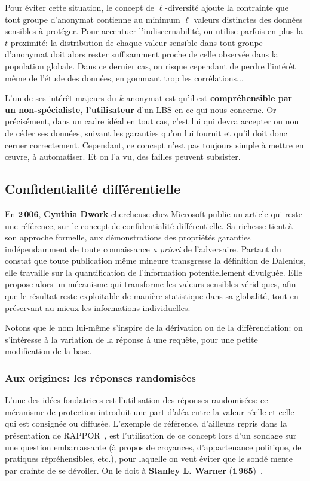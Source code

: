 \documentclass[a4paper,11pt]{article} %
\begin{document}
Pour éviter cette situation, le concept de $\ell$-diversité ajoute la contrainte que tout groupe d'anonymat contienne au minimum $\ell$ valeurs distinctes des données sensibles à protéger. 
Pour accentuer l'indiscernabilité, on utilise parfois en plus la $t$-proximité: la distribution de chaque valeur sensible dans tout groupe d'anonymat doit alors rester suffisamment proche de celle observée dans la population globale. Dans ce dernier cas, on risque cependant de perdre l'intérêt même de l'étude des données, en gommant trop les corrélations...

L'un de ses intérêt majeurs du $k$-anonymat est qu'il est \textbf{compréhensible par un non-spécialiste, l'utilisateur} d'un LBS en ce qui nous concerne.
Or précisément, dans un cadre idéal en tout cas, c'est lui qui devra accepter ou non de céder ses données, suivant les garanties qu'on lui fournit et qu'il doit donc cerner correctement.
Cependant, ce concept n'est pas toujours simple à mettre en œuvre, à automatiser. Et on l'a vu, des failles peuvent subsister. 
%
\subsection{Confidentialité différentielle}
%
En $\mathbf{2\,006}$, \textbf{Cynthia Dwork} chercheuse chez Microsoft publie un article qui reste une référence, sur le concept de confidentialité différentielle. 
Sa richesse tient à son approche formelle, aux démonstrations des propriétés garanties indépendamment de toute connaissance \textit{a priori} de l'adversaire.
Partant du constat que toute publication même mineure transgresse la définition de Dalenius, elle travaille sur la quantification de l'information potentiellement divulguée.
Elle propose alors un mécanisme qui transforme les valeurs sensibles véridiques, afin que le résultat reste exploitable de manière statistique dans sa globalité, tout en préservant au mieux les informations individuelles.

Notons que le nom lui-même s'inspire de la dérivation ou de la différenciation: on s'intéresse à la variation de la réponse à une requête, pour une petite modification de la base.

\subsubsection{Aux origines: les réponses \og randomisées\fg{}}
L'une des idées fondatrices est l'utilisation des réponses randomisées: ce mécanisme de protection introduit une part d'aléa entre la valeur réelle et celle qui est consignée ou diffusée.
L'exemple de référence, d'ailleurs repris dans la présentation de RAPPOR~\cite{EPK14}, est l'utilisation de ce concept lors d'un sondage sur une question embarrassante (à propos de croyances, d'appartenance politique, de pratiques répréhensibles, etc.), pour laquelle on veut éviter que le sondé mente par crainte de se dévoiler. 
On le doit à \textbf{Stanley L. Warner} ($\mathbf{1\,965}$)~\cite{W65}.
\end{document}
